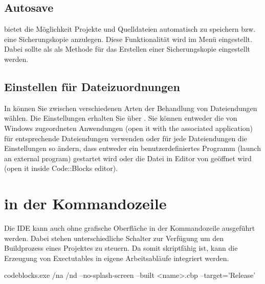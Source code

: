 \subsection{Autosave}

\codeblocks bietet die Möglichkeit Projekte und Quelldateien automatisch zu speichern bzw. eine Sicherungskopie anzulegen. Diese Funktionalität wird im Menü  eingestellt. Dabei sollte als  als Methode für das Erstellen einer Sicherungskopie eingestellt werden.

\subsection{Einstellen für Dateizuordnungen}\label{sec:file_extension}

In \codeblocks können Sie zwischen verschiedenen Arten der Behandlung von Dateiendungen wählen.  Die Einstellungen erhalten Sie über .
Sie können entweder die von Windows zugeordneten Anwendungen (open it with the associated application) für entsprechende Dateiendungen verwenden oder für jede Dateiendungen die Einstellungen so ändern, dass entweder ein benutzerdefiniertes Programm (launch an external program) gestartet wird oder die Datei in Editor von \codeblocks geöffnet wird (open it inside Code::Blocks editor).


\section{\codeblocks in der Kommandozeile}

Die IDE \codeblocks kann auch ohne grafische Oberfläche in der Kommandozeile ausgeführt werden. Dabei stehen unterschiedliche Schalter zur Verfügung um den Buildprozess eines Projektes zu steuern. Da \codeblocks somit skriptfähig ist, kann die Erzeugung von Exectutables in eigene Arbeitsabläufe integriert werden.

\begin{cmd}
codeblocks.exe /na /nd --no-splash-screen --built <name>.cbp --target='Release'
\end{cmd}


